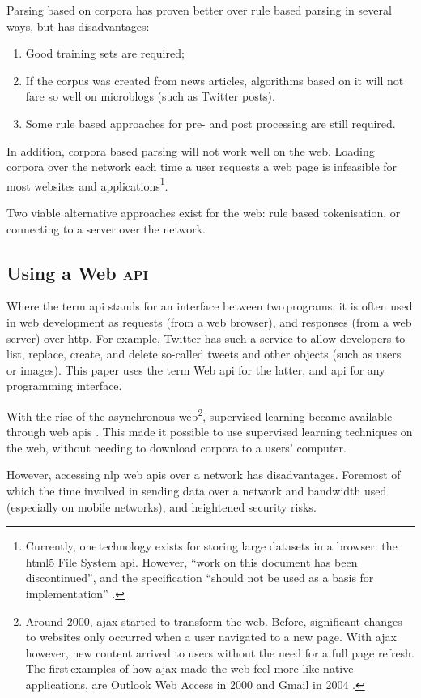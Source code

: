 Parsing based on corpora has proven better over rule based
  parsing in several ways, but has disadvantages:

\begin{enumerate}
\item Good training sets are required;
\item If the corpus was created from news articles, algorithms based on it
  will not fare so well on microblogs (such as Twitter posts).
\item Some rule based approaches for pre- and post processing are still
  required.
\end{enumerate}

\noindent In addition, corpora based parsing will not work well on the web.
Loading corpora over the network each time a user requests a web page is
  infeasible for most websites and applications\footnote{Currently,
      one\,technology exists for storing large datasets in a browser: the
      \acrshort{html5} File System \acrshort{api}.
    However, ``work on this document has been discontinued'', and the
      specification ``should not be used as a basis for implementation''
      \autocite{urhane-file-api}.}.

Two viable alternative approaches exist for the web: rule based tokenisation,
  or connecting to a server over the network.

\subsection{Using a Web \textsc{api}}\label{using-a-web}

Where the term \gls{api} stands for an interface between two\,programs,
  it is often used in web development as requests (from a web browser),
  and responses (from a web server) over \gls{http}.
For example, Twitter has such a service to allow developers to list,
  replace, create, and delete so-called tweets and other objects (such as
  users or images).
This paper uses the term Web \gls{api} for the latter, and \gls{api} for
any programming interface.

With the rise of the asynchronous web\footnote{Around 2000,
    \gls{ajax} started to transform the web.
  Before, significant changes to websites only occurred when a user
    navigated to a new page. 
  With \gls{ajax} however, new content arrived to users without the need
    for a full page refresh.
  The first\,examples of how \gls{ajax} made the web feel more like native
    applications, are Outlook Web Access in 2000
    \autocite{technet-outlook-web-access} and Gmail in 2004
    \autocite{gmailblog-gmail-ajax}.},
  supervised learning became available through web \glspl{api}
  \autocites{textteaser-web-api}{wordnet-web-api}{textrazor-web-api}.
This made it possible to use supervised learning techniques on the web,
  without needing to download corpora to a users' computer.

However, accessing \gls{nlp} web \glspl{api} over a network has
  disadvantages.
Foremost of which the time involved in sending data over a network and
  bandwidth used (especially on mobile networks), and heightened security
  risks.
